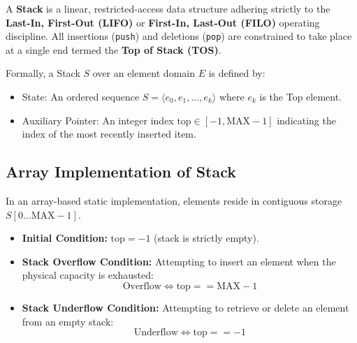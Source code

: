 \documentclass[12pt,a4paper]{article}
\begin{document}
\begin{tcolorbox}[defbox, title={\textbf{Definition: Stack Abstract Data Type (ADT)}}]
A \textbf{Stack} is a linear, restricted-access data structure adhering strictly to the \textbf{Last-In, First-Out (LIFO)} or \textbf{First-In, Last-Out (FILO)} operating discipline. All insertions (\texttt{push}) and deletions (\texttt{pop}) are constrained to take place at a single end termed the \textbf{Top of Stack (TOS)}.
\par\vspace{4pt}
Formally, a Stack $S$ over an element domain $E$ is defined by:
\begin{itemize}[leftmargin=*, nosep]
  \item State: An ordered sequence $S = \langle e_0, e_1, \dots, e_k \rangle$ where $e_k$ is the Top element.
  \item Auxiliary Pointer: An integer index $\text{top} \in [-1, \text{MAX}-1]$ indicating the index of the most recently inserted item.
\end{itemize}
\end{tcolorbox}

\subsection{Array Implementation of Stack}
In an array-based static implementation, elements reside in contiguous storage $S[0 \dots \text{MAX}-1]$.
\begin{itemize}[leftmargin=*, itemsep=3pt]
  \item \textbf{Initial Condition:} $\text{top} = -1$ (stack is strictly empty).
  \item \textbf{Stack Overflow Condition:} Attempting to insert an element when the physical capacity is exhausted:
  \begin{equation}
    \text{Overflow} \iff \text{top} == \text{MAX} - 1
  \end{equation}
  \item \textbf{Stack Underflow Condition:} Attempting to retrieve or delete an element from an empty stack:
  \begin{equation}
    \text{Underflow} \iff \text{top} == -1
  \end{equation}
\end{itemize}
\end{document}
